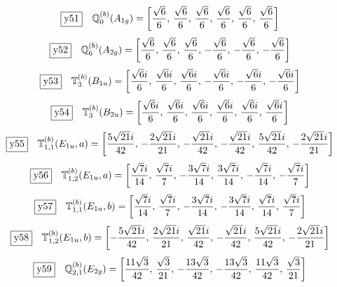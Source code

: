 \documentclass[fleqn,10pt,landscape]{jsarticle}
\begin{document}
\begin{dmath*}
\fbox{y51}\quad \mathbb{Q}_{0}^{(b)}(A_{1g})=\left[ \frac{\sqrt{6}}{6},\, \frac{\sqrt{6}}{6},\, \frac{\sqrt{6}}{6},\, \frac{\sqrt{6}}{6},\, \frac{\sqrt{6}}{6},\, \frac{\sqrt{6}}{6} \right]
\end{dmath*}
\begin{dmath*}
\fbox{y52}\quad \mathbb{Q}_{6}^{(b)}(A_{2g})=\left[ \frac{\sqrt{6}}{6},\, \frac{\sqrt{6}}{6},\, \frac{\sqrt{6}}{6},\, - \frac{\sqrt{6}}{6},\, - \frac{\sqrt{6}}{6},\, - \frac{\sqrt{6}}{6} \right]
\end{dmath*}
\begin{dmath*}
\fbox{y53}\quad \mathbb{T}_{3}^{(b)}(B_{1u})=\left[ \frac{\sqrt{6} i}{6},\, \frac{\sqrt{6} i}{6},\, \frac{\sqrt{6} i}{6},\, - \frac{\sqrt{6} i}{6},\, - \frac{\sqrt{6} i}{6},\, - \frac{\sqrt{6} i}{6} \right]
\end{dmath*}
\begin{dmath*}
\fbox{y54}\quad \mathbb{T}_{3}^{(b)}(B_{2u})=\left[ \frac{\sqrt{6} i}{6},\, \frac{\sqrt{6} i}{6},\, \frac{\sqrt{6} i}{6},\, \frac{\sqrt{6} i}{6},\, \frac{\sqrt{6} i}{6},\, \frac{\sqrt{6} i}{6} \right]
\end{dmath*}
\begin{dmath*}
\fbox{y55}\quad \mathbb{T}_{1,1}^{(b)}(E_{1u},a)=\left[ \frac{5 \sqrt{21} i}{42},\, - \frac{2 \sqrt{21} i}{21},\, - \frac{\sqrt{21} i}{42},\, - \frac{\sqrt{21} i}{42},\, \frac{5 \sqrt{21} i}{42},\, - \frac{2 \sqrt{21} i}{21} \right]
\end{dmath*}
\begin{dmath*}
\fbox{y56}\quad \mathbb{T}_{1,2}^{(b)}(E_{1u},a)=\left[ \frac{\sqrt{7} i}{14},\, \frac{\sqrt{7} i}{7},\, - \frac{3 \sqrt{7} i}{14},\, \frac{3 \sqrt{7} i}{14},\, - \frac{\sqrt{7} i}{14},\, - \frac{\sqrt{7} i}{7} \right]
\end{dmath*}
\begin{dmath*}
\fbox{y57}\quad \mathbb{T}_{1,1}^{(b)}(E_{1u},b)=\left[ \frac{\sqrt{7} i}{14},\, \frac{\sqrt{7} i}{7},\, - \frac{3 \sqrt{7} i}{14},\, - \frac{3 \sqrt{7} i}{14},\, \frac{\sqrt{7} i}{14},\, \frac{\sqrt{7} i}{7} \right]
\end{dmath*}
\begin{dmath*}
\fbox{y58}\quad \mathbb{T}_{1,2}^{(b)}(E_{1u},b)=\left[ - \frac{5 \sqrt{21} i}{42},\, \frac{2 \sqrt{21} i}{21},\, \frac{\sqrt{21} i}{42},\, - \frac{\sqrt{21} i}{42},\, \frac{5 \sqrt{21} i}{42},\, - \frac{2 \sqrt{21} i}{21} \right]
\end{dmath*}
\begin{dmath*}
\fbox{y59}\quad \mathbb{Q}_{2,1}^{(b)}(E_{2g})=\left[ \frac{11 \sqrt{3}}{42},\, \frac{\sqrt{3}}{21},\, - \frac{13 \sqrt{3}}{42},\, - \frac{13 \sqrt{3}}{42},\, \frac{11 \sqrt{3}}{42},\, \frac{\sqrt{3}}{21} \right]
\end{dmath*}
\end{document}
